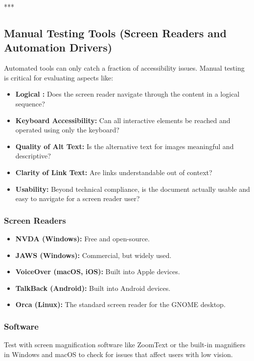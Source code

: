 ***

\subsection{Manual Testing Tools (Screen Readers and Automation Drivers)}
\label{sub:manual-testing-tools-screen-readers-and-automation-drivers}

Automated tools can only catch a fraction of accessibility issues. Manual testing is critical for evaluating aspects like:
\begin{itemize}
	\item \textbf{Logical :} Does the screen reader navigate through the content in a logical sequence?
	\item \textbf{Keyboard Accessibility:} Can all interactive elements be reached and operated using only the keyboard?
	\item \textbf{Quality of Alt Text:} Is the alternative text for images meaningful and descriptive?
	\item \textbf{Clarity of Link Text:} Are links understandable out of context?
	\item \textbf{Usability:} Beyond technical compliance, is the document actually usable and easy to navigate for a screen reader user?
\end{itemize}
\subsubsection{Screen Readers}
\label{sub:screen-readers}
\begin{itemize}
	\item \textbf{NVDA (Windows):} Free and open-source.
	\item \textbf{JAWS (Windows):} Commercial, but widely used.
	\item \textbf{VoiceOver (macOS, iOS):} Built into Apple devices.
	\item \textbf{TalkBack (Android):} Built into Android devices.
	\item \textbf{Orca (Linux):} The standard screen reader for the GNOME desktop.
\end{itemize}

\subsubsection{ Software}
\label{sub:magnification-software}
Test with screen magnification software like ZoomText or the built-in magnifiers in Windows and macOS to check for issues that affect users with low vision.

